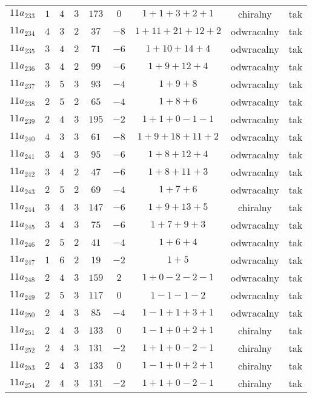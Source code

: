 \begin{longtable}{ccccccccc}
$11a_{233}$ & $1$ & $4$ & $3$ & $173$ & $0$ & $1+1+3+2+1$ & chiralny & tak \\
$11a_{234}$ & $4$ & $3$ & $2$ & $37$ & $-8$ & $1+11+21+12+2$ & odwracalny & tak \\
$11a_{235}$ & $3$ & $4$ & $2$ & $71$ & $-6$ & $1+10+14+4$ & odwracalny & tak \\
$11a_{236}$ & $3$ & $4$ & $2$ & $99$ & $-6$ & $1+9+12+4$ & odwracalny & tak \\
$11a_{237}$ & $3$ & $5$ & $3$ & $93$ & $-4$ & $1+9+8$ & odwracalny & tak \\
$11a_{238}$ & $2$ & $5$ & $2$ & $65$ & $-4$ & $1+8+6$ & odwracalny & tak \\
$11a_{239}$ & $2$ & $4$ & $3$ & $195$ & $-2$ & $1+1+0-1-1$ & odwracalny & tak \\
$11a_{240}$ & $4$ & $3$ & $3$ & $61$ & $-8$ & $1+9+18+11+2$ & odwracalny & tak \\
$11a_{241}$ & $3$ & $4$ & $3$ & $95$ & $-6$ & $1+8+12+4$ & odwracalny & tak \\
$11a_{242}$ & $3$ & $4$ & $2$ & $47$ & $-6$ & $1+8+11+3$ & odwracalny & tak \\
$11a_{243}$ & $2$ & $5$ & $2$ & $69$ & $-4$ & $1+7+6$ & odwracalny & tak \\
$11a_{244}$ & $3$ & $4$ & $3$ & $147$ & $-6$ & $1+9+13+5$ & chiralny & tak \\
$11a_{245}$ & $3$ & $4$ & $3$ & $75$ & $-6$ & $1+7+9+3$ & odwracalny & tak \\
$11a_{246}$ & $2$ & $5$ & $2$ & $41$ & $-4$ & $1+6+4$ & odwracalny & tak \\
$11a_{247}$ & $1$ & $6$ & $2$ & $19$ & $-2$ & $1+5$ & odwracalny & tak \\
$11a_{248}$ & $2$ & $4$ & $3$ & $159$ & $2$ & $1+0-2-2-1$ & odwracalny & tak \\
$11a_{249}$ & $2$ & $5$ & $3$ & $117$ & $0$ & $1-1-1-2$ & odwracalny & tak \\
$11a_{250}$ & $2$ & $4$ & $3$ & $85$ & $-4$ & $1-1+1+3+1$ & odwracalny & tak \\
$11a_{251}$ & $2$ & $4$ & $3$ & $133$ & $0$ & $1-1+0+2+1$ & chiralny & tak \\
$11a_{252}$ & $2$ & $4$ & $3$ & $131$ & $-2$ & $1+1+0-2-1$ & chiralny & tak \\
$11a_{253}$ & $2$ & $4$ & $3$ & $133$ & $0$ & $1-1+0+2+1$ & chiralny & tak \\
$11a_{254}$ & $2$ & $4$ & $3$ & $131$ & $-2$ & $1+1+0-2-1$ & chiralny & tak \\

\end{longtable}
